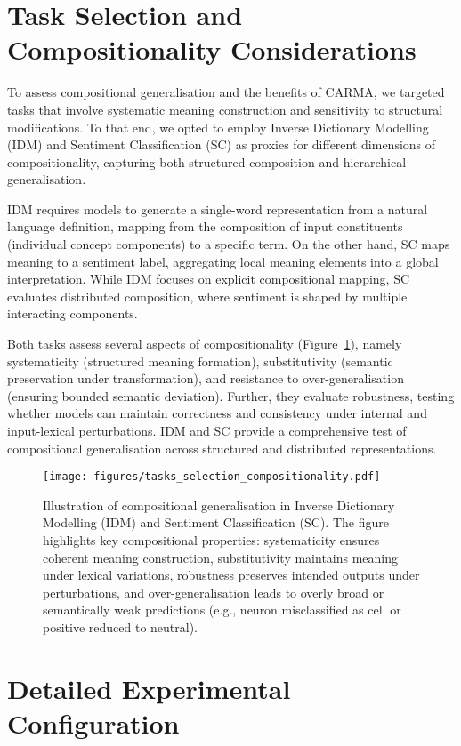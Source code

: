 \appendix
\section{Task Selection and Compositionality Considerations}\label{sec:task_selection}
To assess compositional generalisation and the benefits of CARMA, we targeted tasks that involve systematic meaning construction and sensitivity to structural modifications. To that end, we opted to employ  Inverse Dictionary Modelling (IDM) and Sentiment Classification (SC) as proxies for different dimensions of compositionality, capturing both structured composition and hierarchical generalisation.

IDM requires models to generate a single-word representation from a natural language definition, mapping from the composition of input constituents (individual concept components) to a specific term. On the other hand, SC maps meaning to a sentiment label, aggregating local meaning elements into a global interpretation. While IDM focuses on explicit compositional mapping, SC evaluates distributed composition, where sentiment is shaped by multiple interacting components. 

Both tasks assess several aspects of compositionality (Figure~\ref{fig:task_comps}), namely systematicity (structured meaning formation), substitutivity (semantic preservation under transformation), and resistance to over-generalisation (ensuring bounded semantic deviation). Further, they evaluate robustness, testing whether models can maintain correctness and consistency under internal and input-lexical perturbations. IDM and SC provide a comprehensive test of compositional generalisation across structured and distributed representations.

\begin{figure}[h]
    \centering
    \texttt{[image: figures/tasks\_selection\_compositionality.pdf]}
    \caption{Illustration of compositional generalisation in Inverse Dictionary Modelling (IDM) and Sentiment Classification (SC). The figure highlights key compositional properties: systematicity ensures coherent meaning construction, substitutivity maintains meaning under lexical variations, robustness preserves intended outputs under perturbations, and over-generalisation leads to overly broad or semantically weak predictions (e.g., neuron misclassified as cell or positive reduced to neutral).}
    \label{fig:task_comps}
\end{figure}


\section{Detailed Experimental Configuration}

